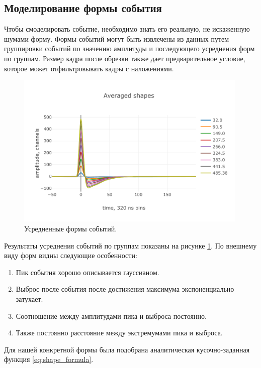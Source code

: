 \documentclass[a4paper,14pt]{extreport}
\begin{document}
\subsection{Моделирование формы события}
Чтобы смоделировать событие, необходимо знать его реальную, не искаженную шумами форму. Формы событий могут быть извлечены из данных путем группировки событий по значению амплитуды и последующего усреднения форм по группам. Размер кадра после обрезки также дает предварительное условие, которое может отфильтровывать кадры с наложениями.

\begin{figure}
  \centering
  \includegraphics[width = 0.99\textwidth]{img/signals/event_shapes_2017_05.pdf}
    \caption{Усредненные формы событий.}
    \label{fig:signals-event-shapes-05}
\end{figure}

Результаты усреднения событий по группам показаны на рисунке \ref{fig:signals-event-shapes-05}. По внешнему виду форм видны следующие особенности:
\begin{enumerate}
    \item Пик события хорошо описывается гауссианом.
    \item Выброс после события после достижения максимума экспоненциально затухает.
    \item Соотношение между амплитудами пика и выброса постоянно.
    \item Также постоянно расстояние между экстремумами пика и выброса.
\end{enumerate}

Для нашей конкретной формы была подобрана аналитическая кусочно-заданная функция \ref{eq:shape_formula}.
\end{document}
